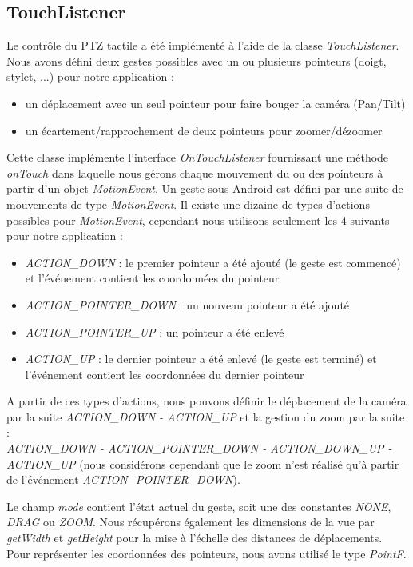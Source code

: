 \subsection{TouchListener}
Le contrôle du PTZ tactile a été implémenté à l'aide de la classe \textit{TouchListener}. Nous avons défini deux gestes possibles avec un ou plusieurs pointeurs (doigt, stylet, ...) pour notre application :
\begin{itemize}
\item un déplacement avec un seul pointeur pour faire bouger la caméra (Pan/Tilt)
\item un écartement/rapprochement de deux pointeurs pour zoomer/dézoomer
\end{itemize}
Cette classe implémente l'interface \textit{OnTouchListener} fournissant une
méthode \textit{onTouch} dans laquelle nous gérons chaque mouvement du ou des
pointeurs à partir d'un objet \textit{MotionEvent}. Un geste sous Android est défini par une suite de mouvements de type \textit{MotionEvent}. Il existe une dizaine de types d'actions possibles pour \textit{MotionEvent}, cependant nous utilisons seulement les 4 suivants pour notre application :
\begin{itemize}
\item \textit{ACTION\_DOWN} : le premier pointeur a été ajouté (le geste est
commencé) et l'événement contient les coordonnées du pointeur
\item \textit{ACTION\_POINTER\_DOWN} : un nouveau pointeur a été ajouté
\item \textit{ACTION\_POINTER\_UP} : un pointeur a été enlevé
\item \textit{ACTION\_UP} : le dernier pointeur a été enlevé (le geste est
terminé) et l'événement contient les coordonnées du dernier pointeur
\end{itemize}
A partir de ces types d'actions, nous pouvons définir le déplacement de la
caméra par la suite \textit{ACTION\_DOWN - ACTION\_UP} et la gestion du zoom par
la suite : \\ \textit{ACTION\_DOWN - ACTION\_POINTER\_DOWN - ACTION\_DOWN\_UP -
ACTION\_UP} (nous considérons cependant que le zoom n'est réalisé qu'à partir de l'événement
\textit{ACTION\_POINTER\_DOWN}).

Le champ \textit{mode} contient l'état actuel du geste, soit une des constantes \textit{NONE}, \textit{DRAG} ou \textit{ZOOM}.
Nous récupérons également les dimensions de la vue par \textit{getWidth} et \textit{getHeight} pour la mise à l'échelle des distances de déplacements. 
Pour représenter les coordonnées des pointeurs, nous avons utilisé le type \textit{PointF}.

